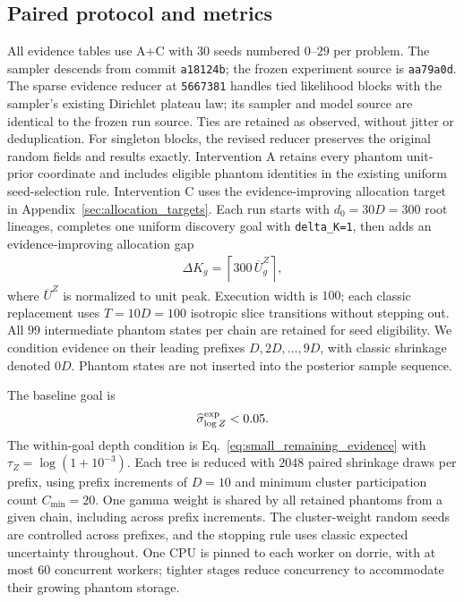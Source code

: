 \subsection{Paired protocol and metrics}

All evidence tables use A+C with $30$ seeds numbered $0$--$29$ per problem.
The sampler descends from commit \texttt{a18124b}; the frozen experiment source is \texttt{aa79a0d}.
The sparse evidence reducer at \texttt{5667381} handles tied likelihood blocks with the sampler's existing Dirichlet plateau law; its sampler and model source are identical to the frozen run source.
Ties are retained as observed, without jitter or deduplication. For singleton blocks, the revised reducer preserves the original random fields and results exactly.
Intervention A retains every phantom unit-prior coordinate and includes eligible phantom identities in the existing uniform seed-selection rule.
Intervention C uses the evidence-improving allocation target in Appendix~\ref{sec:allocation_targets}.
Each run starts with $d_0=30D=300$ root lineages, completes one uniform discovery goal with \texttt{delta\_K=1}, then adds an evidence-improving allocation gap
\begin{align}
    \Delta K_g=\left\lceil300\,\overline U^Z_g\right\rceil,
\end{align}
where $\overline U^Z$ is normalized to unit peak.
Execution width is $100$; each classic replacement uses $T=10D=100$ isotropic slice transitions without stepping out.
All $99$ intermediate phantom states per chain are retained for seed eligibility.
We condition evidence on their leading prefixes $D,2D,\ldots,9D$, with classic shrinkage denoted $0D$.
Phantom states are not inserted into the posterior sample sequence.

The baseline goal is
\begin{align}
    \widehat\sigma^{\rm exp}_{\log Z}<0.05.\label{eq:benchmark_goal}
\end{align}
The within-goal depth condition is Eq.~\ref{eq:small_remaining_evidence} with $\tau_Z=\log(1+10^{-3})$.
Each tree is reduced with $2048$ paired shrinkage draws per prefix, using prefix increments of $D=10$ and minimum cluster participation count $C_{\min}=20$.
One gamma weight is shared by all retained phantoms from a given chain, including across prefix increments.
The cluster-weight random seeds are controlled across prefixes, and the stopping rule uses classic expected uncertainty throughout.
One CPU is pinned to each worker on dorrie, with at most $60$ concurrent workers; tighter stages reduce concurrency to accommodate their growing phantom storage.

